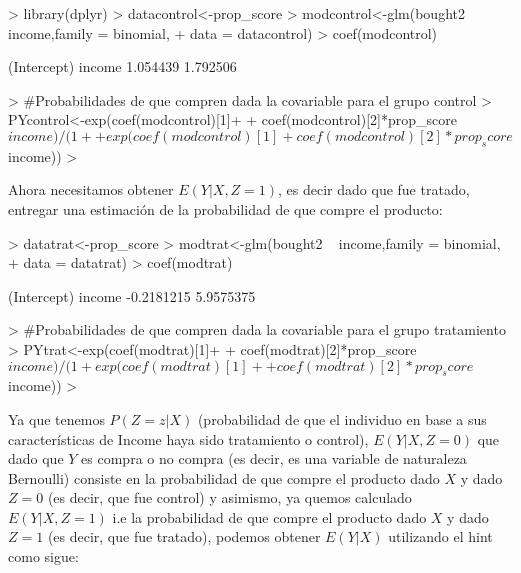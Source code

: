 \documentclass[11pt,onside]{article}
\begin{document}
\begin{itemize}
\begin{Schunk}
\begin{Sinput}
> library(dplyr)
> datacontrol<-prop_score%>%filter(sent=="0")
> modcontrol<-glm(bought2 ~ income,family = binomial,
+                 data = datacontrol)
> coef(modcontrol)
\end{Sinput}
\begin{Soutput}
(Intercept)      income 
   1.054439    1.792506 
\end{Soutput}
\begin{Sinput}
> #Probabilidades de que compren dada la covariable para el grupo control
> PYcontrol<-exp(coef(modcontrol)[1]+
+                        coef(modcontrol)[2]*prop_score$income)/(1+
+ exp(coef(modcontrol)[1]+ coef(modcontrol)[2]*prop_score$income)) 
> 
\end{Sinput}
\end{Schunk}

Ahora necesitamos obtener $E(Y\vert X,Z=1)$, es decir dado que fue tratado, entregar una estimación de la probabilidad de que compre el producto:

\begin{Schunk}
\begin{Sinput}
> datatrat<-prop_score%>%filter(sent=="1")
> modtrat<-glm(bought2 ~ income,family = binomial, 
+              data = datatrat)
> coef(modtrat)
\end{Sinput}
\begin{Soutput}
(Intercept)      income 
 -0.2181215   5.9575375 
\end{Soutput}
\begin{Sinput}
> #Probabilidades de que compren dada la covariable para el grupo tratamiento
> PYtrat<-exp(coef(modtrat)[1]+
+                     coef(modtrat)[2]*prop_score$income)/(1+exp(coef(modtrat)[1]+
+ coef(modtrat)[2]*prop_score$income)) 
> 
\end{Sinput}
\end{Schunk}

Ya que tenemos $P(Z=z|X)$ (probabilidad de que el individuo en base a sus características de Income haya sido tratamiento o control), $E(Y\vert X,Z=0)$ que dado que $Y$ es compra o no compra (es decir, es una variable de naturaleza Bernoulli) consiste en la probabilidad de que compre el producto dado $X$ y dado $Z=0$ (es decir, que fue control) y asimismo, ya quemos calculado  $E(Y\vert X,Z=1)$ i.e la probabilidad de que compre el producto dado $X$ y dado $Z=1$ (es decir, que fue tratado), podemos obtener $E(Y|X)$ utilizando el hint como sigue:


\end{itemize}
\end{document}
